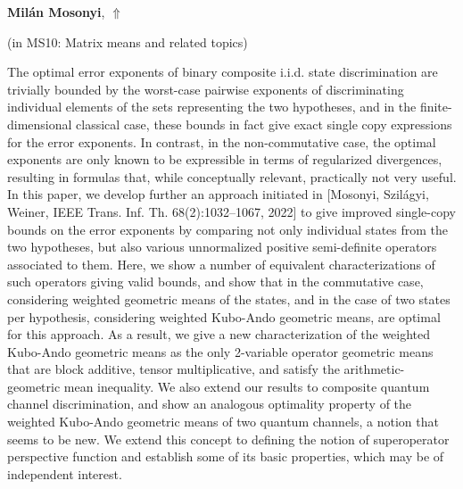 \documentclass[ILAS2025-program.tex]{subfiles}
\begin{document}
\hypertarget{down0253}{}\begin{ilasabstract}
    
\textbf{Milán Mosonyi},  \hfill \hyperlink{up0253}{$\Uparrow$}
    
    
(in {\color{mstitle}MS10: Matrix means and related topics})
        
\mtskip
    The optimal error exponents of binary composite i.i.d. state discrimination are trivially bounded by the worst-case pairwise exponents of discriminating individual elements of the sets representing the two hypotheses, and in the finite-dimensional classical case, these bounds in fact give exact single copy expressions for the error exponents. In contrast, in the non-commutative case, the optimal exponents are only known to be expressible in terms of regularized divergences, resulting in formulas that, while conceptually relevant, practically not very useful. In this paper, we develop further an approach initiated in [Mosonyi, Szilágyi, Weiner, IEEE Trans. Inf. Th. 68(2):1032–1067, 2022] to give improved single-copy bounds on the error exponents by comparing not only individual states from the two hypotheses, but also various unnormalized positive semi-definite operators associated to them. Here, we show a number of equivalent characterizations of such operators giving valid bounds, and show that in the commutative case, considering weighted geometric means of the states, and in the case of two states per hypothesis, considering weighted Kubo-Ando geometric means, are optimal for this approach. As a result, we give a new characterization of the weighted Kubo-Ando geometric means as the only 2-variable operator geometric means that are block additive, tensor multiplicative, and satisfy the arithmetic-geometric mean inequality. We also extend our results to composite quantum channel discrimination, and show an analogous optimality property of the weighted Kubo-Ando geometric means of two quantum channels, a notion that seems to be new. We extend this concept to defining the notion of superoperator perspective function and establish some of its basic properties, which may be of independent interest.

\end{ilasabstract}
    
\end{document}
